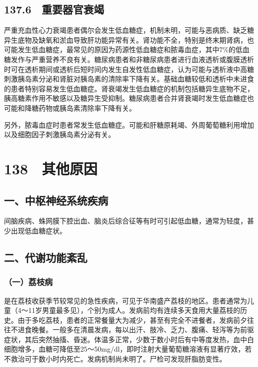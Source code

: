 \subsection{137.6　重要器官衰竭}

严重充血性心力衰竭患者偶尔会发生低血糖症，机制未明，可能与恶病质、缺乏糖异生底物及缺氧和淤血导致肝功能异常有关。肾功能不全，特别是终末期肾病，也可能发生低血糖症，最常见的原因为药源性低血糖症和脓毒血症，其中7\%的低血糖发作与严重营养不良有关。糖尿病患者和非糖尿病患者进行血液透析或腹膜透析时可在透析期间或透析后短时间内发生自发性低血糖症，认为可能与透析液中高糖刺激胰岛素分泌和肾脏对胰岛素的清除率下降有关。基础血糖较低和透析中未进食的患者特别容易发生低血糖症。肾衰竭发生低血糖症的机制包括糖异生底物不足，胰高糖素作用不敏感以及糖异生受抑制。糖尿病患者合并肾衰竭时发生低血糖症也可能和降糖药物或胰岛素清除率下降有关。

另外，脓毒血症时患者常发生低血糖症。可能和肝糖原耗竭、外周葡萄糖利用增加以及细胞因子刺激胰岛素分泌有关。

\protect\hypertarget{text00320.html}{}{}

\section{138　其他原因}

\subsection{一、中枢神经系统疾病}

间脑疾病、蛛网膜下腔出血、脑炎后综合征等有时可引起低血糖，通常为轻度，甚少出现低血糖症状。

\subsection{二、代谢功能紊乱}

\subsubsection{（一）荔枝病}

是在荔枝收获季节较常见的急性疾病，可见于华南盛产荔枝的地区。患者通常为儿童（4～11岁男童最多见），个别为成人。发病前均有连续多天食用大量荔枝的历史。由于多吃荔枝，患者的正常餐量大为减少，甚至有完全不进餐者，发病前夕往往不进食晚餐。一般多在清晨发病，每以出汗、肢冷、乏力、腹痛、轻泻等为前驱症状，其后突然抽搐、昏迷。体温多正常，少数于数小时后有中等度发热，血中白细胞增多，血糖可降低至25～50mg/dl，即时注射大量葡萄糖溶液有显著疗效，若不救治可于数小时内死亡。发病机制尚未明了。尸检可发现肝脂肪变性。

